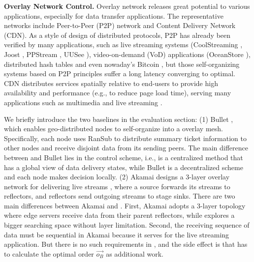 \textbf{Overlay Network Control.}
Overlay network releases great potential to various applications, especially for data transfer applications. The representative networks include Peer-to-Peer (P2P) network and Content Delivery Network (CDN). As a style of design of distributed protocols, P2P has already been verified by many applications, such as live streaming systems (CoolStreaming \cite{zhang2005coolstreaming}, Joost \cite{Joost}, PPStream \cite{PPStream}, UUSee \cite{UUSee}), video-on-demand (VoD) applications (OceanStore \cite{oceanstore}), distributed hash tables \cite{rhea2005opendht} and even nowaday's Bitcoin \cite{eyal2016bitcoin}, but those self-organizing systems based on P2P principles suffer a long latency converging to optimal. CDN distributes services spatially relative to end-users to provide high availability and performance (e.g., to reduce page load time), serving many applications such as multimedia \cite{zhu2011multimedia} and live streaming \cite{sripanidkulchai2004analysis}.

We briefly introduce the two baselines in the evaluation section: (1) Bullet \cite{kostic2003bullet}, which enables geo-distributed nodes to self-organize into a overlay mesh. Specifically, each node uses RanSub \cite{Rodriguez2003Using} to distribute summary ticket information to other nodes and receive disjoint data from its sending peers. The main difference between \name and Bullet lies in the control scheme, i.e., \name is a centralized method that has a global view of data delivery states, while Bullet is a decentralized scheme and each node makes decision locally. (2) Akamai designs a 3-layer overlay network for delivering live streams \cite{Andreev2013Designing}, where a source forwards its streams to reflectors, and reflectors send outgoing streams to stage sinks. There are two main differences between Akamai and \name. First, Akamai adopts a 3-layer topology where edge servers receive data from their parent reflectors, while \name explores a bigger searching space without layer limitation. Second, the receiving sequence of data must be sequential in Akamai because it serves for the live streaming application. But there is no such requirements in \name, and the side effect is that \name has to calculate the optimal order $\overrightarrow{o_B}$ as additional work.


